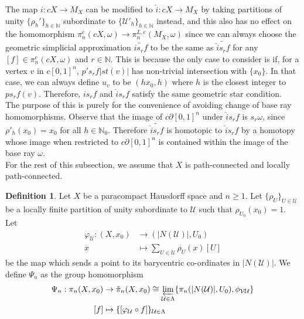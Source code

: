 \documentclass[a4paper,11pt]{article}
\theoremstyle{definition}
\newtheorem{definition}{Definition}[section]
\theoremstyle{plain}
\theoremstyle{remark}
\begin{document}
{The map $i: cX\rightarrow M_{X}$ can be modified to $\hat{i}: cX\rightarrow M_{X}$ by taking partitions of unity $\{\rho_{h}'\}_{h\in \mathbb{N}}$ subordinate to $\{\mathcal{U}'_{h}\}_{h\in \mathbb{N}}$ instead, and this also has no effect on the homomorphism $\pi_{n}^{c}(cX,\omega)\rightarrow \pi_{n}^{L,e}(M_{X},\omega)$ since we can always choose the geometric simplicial approximation $\widetilde{is_{r}f}$ to be the same as $\widetilde{\hat{i}s_{r}f}$ for any $[f]\in \pi_{n}^{c}(cX,\omega)$ and $r\in \mathbb{N}$. This is because the only case to consider is if, for a vertex $v$ in $c[0,1]^n$, $p' s_{r}f |st(v)|$ has non-trivial intersection with $\{x_0\}$. In that case, we can always define $u_{v}$ to be $(hx_{0},h)$ where $h$ is the closest integer to $p s_{r}f(v)$. Therefore, $is_{r}f$ and $\hat{i}s_{r}f$ satisfy the same geometric star condition. \\

The purpose of this is purely for the convenience of avoiding change of base ray homomorphisms. Observe that the image of $c\partial[0,1]^n$ under $\hat{i}s_{r}f$ is $s_{r} \omega$, since $\rho'_{h}(x_0) = x_{0}$ for all $h\in \mathbb{N}_{0}$. Therefore $\widetilde{\hat{i}s_{r}f}$ is homotopic to $\hat{i}s_{r}f$ by a homotopy whose image when restricted to $c\partial[0,1]^n$ is contained within the image of the base ray $\omega$.\\

For the rest of this subsection, we assume that $X$ is path-connected and locally path-connected. 

\begin{definition} \label{psispanier} Let $X$ be a paracompact Hausdorff space and $n\geq 1$. Let $\{\rho_{U}\}_{U\in \mathcal{U}}$ be a locally finite partition of unity subordinate to $\mathcal{U}$ such that $\rho_{U_{0}}(x_0) = 1$. Let 
\begin{align*}
\varphi_{\mathcal{U}}: (X,x_0) &\rightarrow (|N(\mathcal{U})|,U_{0}) \\
x &\mapsto \sum_{U\in \mathcal{U}} \rho_{U}(x) [U]
\end{align*}
be the map which sends a point to its barycentric co-ordinates in $|N(\mathcal{U})|$. We define $\Psi_{n}$ as the group homomorphism 
\begin{align*}
\Psi_{n}: \pi_{n}(X,x_0) &\rightarrow \check{\pi}_{n}(X,x_0) \cong \varprojlim_{\mathcal{U}\in \Lambda} \{\pi_{n}(|N(\mathcal{U})|, U_{0}), \phi_{\mathcal{V}\mathcal{U}}\}\\
[f] &\mapsto \{[\varphi_{\mathcal{U}}\circ f]\}_{\mathcal{U}\in \Lambda}
\end{align*}
 \end{definition}
 
}
\end{document}
